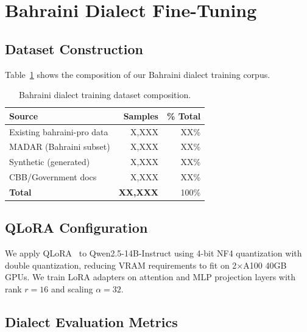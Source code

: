 \documentclass[11pt]{article}
\begin{document}
\section{Bahraini Dialect Fine-Tuning}

\subsection{Dataset Construction}

Table~\ref{tab:dataset} shows the composition of our Bahraini dialect training corpus.

\begin{table}[h]
\centering
\begin{tabular}{lrr}
\toprule
Source & Samples & \% Total \\
\midrule
Existing bahraini-pro data & X,XXX & XX\% \\
MADAR (Bahraini subset) & X,XXX & XX\% \\
Synthetic (generated) & X,XXX & XX\% \\
CBB/Government docs & X,XXX & XX\% \\
\midrule
\textbf{Total} & \textbf{XX,XXX} & 100\% \\
\bottomrule
\end{tabular}
\caption{Bahraini dialect training dataset composition.}
\label{tab:dataset}
\end{table}

\subsection{QLoRA Configuration}

We apply QLoRA~\cite{dettmers2023qlora} to Qwen2.5-14B-Instruct
using 4-bit NF4 quantization with double quantization, reducing VRAM
requirements to fit on 2×A100 40GB GPUs.
We train LoRA adapters on attention and MLP projection layers
with rank $r=16$ and scaling $\alpha=32$.

\subsection{Dialect Evaluation Metrics}
\end{document}
